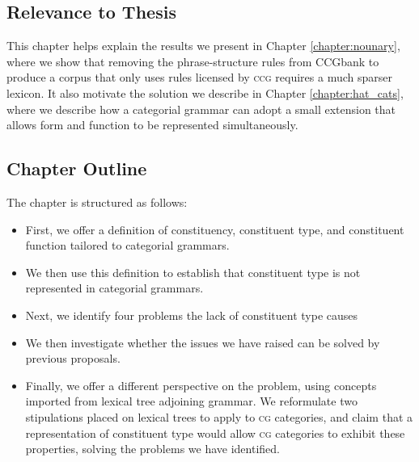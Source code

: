 \documentclass[11pt,twoside,final]{ahudson-harvard}
\newcommand{\ccg}{\textsc{ccg}\xspace}
\newcommand{\ccgbank}{CCGbank\xspace}
\newcommand{\cg}{\textsc{cg}\xspace}
\begin{document}
\subsection{Relevance to Thesis}

This chapter helps explain the results we present in Chapter \ref{chapter:nounary}, where we show that removing the phrase-structure rules from \ccgbank to produce a corpus that only uses rules licensed by \ccg requires a much sparser lexicon. It also motivate the solution we describe in Chapter \ref{chapter:hat_cats}, where we describe how a categorial grammar can adopt a small extension that allows form and function to be represented simultaneously.

\subsection{Chapter Outline}

The chapter is structured as follows:
\begin{itemize}
\item First, we offer a definition of constituency, constituent type, and constituent function tailored to categorial grammars.
\item We then use this definition to establish that constituent type is not represented in categorial grammars.
\item Next, we identify four problems the lack of constituent type causes
\item We then investigate whether the issues we have raised can be solved by previous proposals.
\item Finally, we offer a different perspective on the problem, using concepts imported from lexical tree adjoining grammar. We reformulate two stipulations placed on lexical trees to apply to \cg categories, and claim that a representation of constituent type would allow \cg categories to exhibit these properties, solving the problems we have identified.
\end{itemize}


\end{document}
